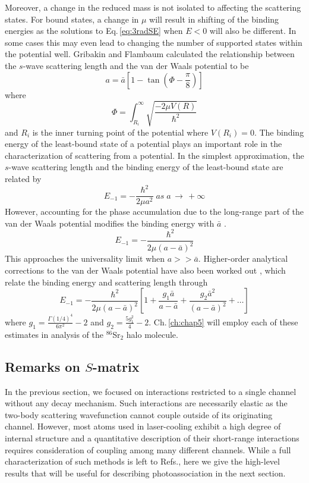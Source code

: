 Moreover, a change in the reduced mass is not isolated to affecting the scattering states.
For bound states, a change in $\mu$ will result in shifting of the binding energies as the solutions to Eq.\,\ref{eq:3radSE} when $E<0$ will also be different.
In some cases this may even lead to changing the number of supported states within the potential well.
Gribakin and Flambaum \cite{gfl93} calculated the relationship between the $s$-wave scattering length and the van der Waals potential to be
\begin{equation}
	a = \bar{a} \left[ 1 - \tan(\Phi - \frac{\pi}{8}) \right]
\end{equation} 
where
\begin{equation}
	\Phi = \int_{R_i}^{\infty} \sqrt{\frac{-2\mu V(R)}{\hbar^2}}
\end{equation}
and $R_i$ is the inner turning point of the potential where $V(R_i)=0$.
The binding energy of the least-bound state of a potential plays an important role in the characterization of scattering from a potential.
In the simplest approximation, the $s$-wave scattering length and the binding energy of the least-bound state are related by
\begin{equation}
	E_{-1} = -\frac{\hbar^2}{2 \mu a^2} \; as \; a\,\rightarrow\,+\infty
\end{equation}
However, accounting for the phase accumulation due to the long-range part of the van der Waals potential modifies the binding energy with $\bar{a}$ \cite{gfl93}.
\begin{equation}
	E_{-1} = -\frac{\hbar^2}{2\mu(a-\bar{a})^2}
\end{equation}
This approaches the universality limit when $a >> \bar{a}$.
Higher-order analytical corrections to the van der Waals potential have also been worked out \cite{gao04}, which relate the binding energy and scattering length through
\begin{equation}
	E_{-1} = -\frac{\hbar^2}{2\mu(a-\bar{a})^2}\left[1 + \frac{g_1 \bar{a}}{a-\bar{a}} + \frac{g_2 \bar{a}^2}{(a-\bar{a})^2}+\dots \right]
\end{equation}
where $g_1=\frac{\Gamma(1/4)^4}{6 \pi^2} - 2$ and $g_2 = \frac{5 g_1^2}{4} - 2$.
Ch.\,\ref{ch:chap5} will employ each of these estimates in analysis of the $^{86}$Sr$_2$ halo molecule.

\subsection{Remarks on $S$-matrix}
In the previous section, we focused on interactions restricted to a single channel without any decay mechanism.
Such interactions are necessarily elastic as the two-body scattering wavefunction cannot couple outside of its originating channel.
However, most atoms used in laser-cooling exhibit a high degree of internal structure and a quantitative description of their short-range interactions requires consideration of coupling among many different channels.
While a full characterization of such methods is left to Refs.\cite{Nicholson2015a,Hutson2007a,Quemener2012,Chin2010,Alexander2014,Vaillant2014}, here we give the high-level results that will be useful for describing photoassociation in the next section.

